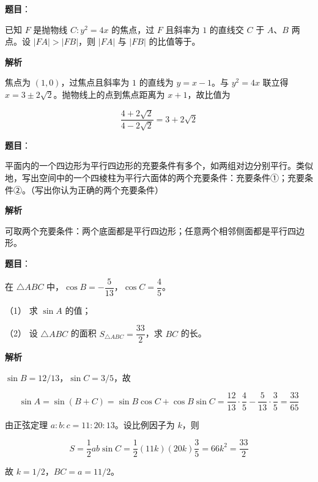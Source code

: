 \begin{answer}

\textbf{题目}：

已知 $F$ 是抛物线 $C:y^2=4x$ 的焦点，过 $F$ 且斜率为 $1$ 的直线交 $C$ 于 $A\text{、}B$ 两点。设 $|FA|>|FB|$，则 $|FA|$ 与 $|FB|$ 的比值等于\gkblank{}。

\textbf{解析}

焦点为 $(1,0)$，过焦点且斜率为 $1$ 的直线为 $y=x-1$。与 $y^2=4x$ 联立得 $x=3\pm2\sqrt2$。抛物线上的点到焦点距离为 $x+1$，故比值为

\nopagebreak[4]
\[
\frac{4+2\sqrt2}{4-2\sqrt2}=3+2\sqrt2
\]


\end{answer}
\begin{answer}

\textbf{题目}：

平面内的一个四边形为平行四边形的充要条件有多个，如两组对边分别平行。类似地，写出空间中的一个四棱柱为平行六面体的两个充要条件：充要条件①\gkblank{}；充要条件②\gkblank{}。（写出你认为正确的两个充要条件）

\textbf{解析}

可取两个充要条件：两个底面都是平行四边形；任意两个相邻侧面都是平行四边形。


\end{answer}
\begin{answer}

\textbf{题目}：

在 $\triangle ABC$ 中，$\cos B=-\dfrac5{13}$，$\cos C=\dfrac45$。

（1） 求 $\sin A$ 的值；

（2） 设 $\triangle ABC$ 的面积 $S_{\triangle ABC}=\dfrac{33}{2}$，求 $BC$ 的长。

\textbf{解析}


$\sin B=12/13$，$\sin C=3/5$，故

\nopagebreak[4]
\[
\sin A=\sin(B+C)=\sin B\cos C+\cos B\sin C
=\frac{12}{13}\cdot\frac45-\frac5{13}\cdot\frac35
=\frac{33}{65}
\]


由正弦定理 $a:b:c=11:20:13$。设比例因子为 $k$，则

\nopagebreak[4]
\[
S=\frac12ab\sin C
=\frac12(11k)(20k)\frac35
=66k^2=\frac{33}{2}
\]

故 $k=1/2$，$BC=a=11/2$。



\end{answer}
